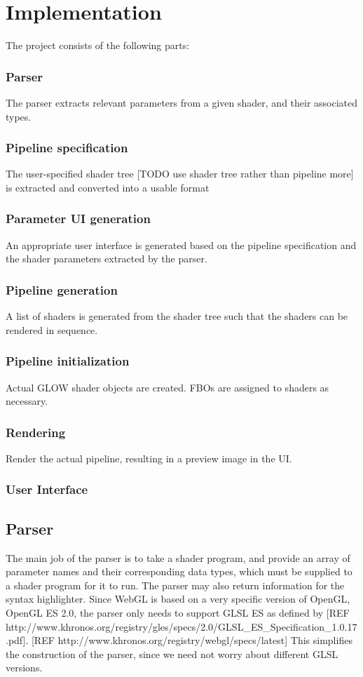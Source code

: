 \documentclass[12pt,twoside,notitlepage]{report}
\begin{document}
\cleardoublepage
\chapter{Implementation}
The project consists of the following parts:
\subsection{Parser}
The parser extracts relevant parameters from a given shader, and their associated types.
\subsection{Pipeline specification}
The user-specified shader tree [TODO use shader tree rather than pipeline more] is extracted and converted into a usable format
\subsection{Parameter UI generation}
An appropriate user interface is generated based on the pipeline specification and the shader parameters extracted by the parser.
\subsection{Pipeline generation}
A list of shaders is generated from the shader tree such that the shaders can be rendered in sequence.
\subsection{Pipeline initialization}
Actual GLOW shader objects are created. FBOs are assigned to shaders as necessary.
\subsection{Rendering}
Render the actual pipeline, resulting in a preview image in the UI.
\subsection{User Interface}

\section{Parser}
The main job of the parser is to take a shader program, and provide an array of parameter names and their corresponding data types, which must be supplied to a shader program for it to run. The parser may also return information for the syntax highlighter. Since WebGL is based on a very specific version of OpenGL, OpenGL ES 2.0, the parser only needs to support GLSL ES as defined by [REF http://www.khronos.org/registry/gles/specs/2.0/GLSL_ES_Specification_1.0.17.pdf]. [REF http://www.khronos.org/registry/webgl/specs/latest] This simplifies the construction of the parser, since we need not worry about different GLSL versions.
\end{document}
